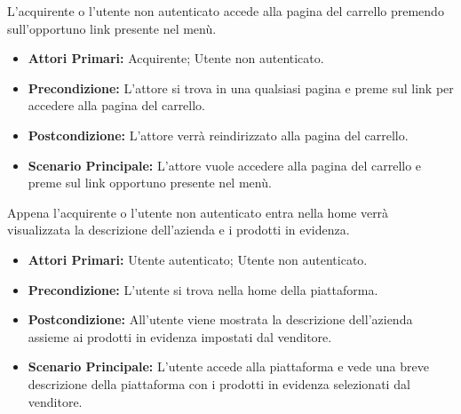 L'acquirente o l'utente non autenticato accede alla pagina del carrello premendo sull'opportuno link presente nel menù.
\begin{itemize}
    \item \textbf{Attori Primari:} Acquirente; Utente non autenticato.
    \item \textbf{Precondizione:} L'attore si trova in una qualsiasi pagina e preme sul link per accedere alla pagina del carrello.
    \item \textbf{Postcondizione:} L'attore verrà reindirizzato alla pagina del carrello.
    \item \textbf{Scenario Principale:} L'attore vuole accedere alla pagina del carrello e preme sul link opportuno presente nel menù.
\end{itemize}

Appena l'acquirente o l'utente non autenticato entra nella home verrà visualizzata la descrizione dell'azienda e i prodotti in evidenza.
\begin{itemize}
    \item \textbf{Attori Primari:} Utente autenticato; Utente non autenticato.
    \item \textbf{Precondizione:} L'utente si trova nella home della piattaforma.
    \item \textbf{Postcondizione:} All'utente viene mostrata la descrizione dell'azienda assieme ai prodotti in evidenza impostati dal venditore.
    \item \textbf{Scenario Principale:} L'utente accede alla piattaforma e vede una breve descrizione della piattaforma con i prodotti in evidenza selezionati dal venditore.
\end{itemize}
